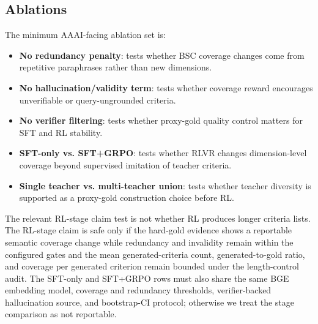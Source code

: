 
\subsection{Ablations}

The minimum AAAI-facing ablation set is:
\begin{itemize}
  \item \textbf{No redundancy penalty}: tests whether BSC coverage changes come from
  repetitive paraphrases rather than new dimensions.
  \item \textbf{No hallucination/validity term}: tests whether coverage reward
  encourages unverifiable or query-ungrounded criteria.
  \item \textbf{No verifier filtering}: tests whether proxy-gold quality
  control matters for SFT and RL stability.
  \item \textbf{SFT-only vs. SFT+GRPO}: tests whether RLVR changes
  dimension-level coverage beyond supervised imitation of teacher criteria.
  \item \textbf{Single teacher vs. multi-teacher union}: tests whether teacher
  diversity is supported as a proxy-gold construction choice before RL.
\end{itemize}
The relevant RL-stage claim test is not whether RL produces longer criteria
lists. The RL-stage claim is safe only if the hard-gold evidence shows a
reportable semantic coverage change while redundancy and invalidity remain within the configured gates and
the mean generated-criteria count, generated-to-gold ratio, and coverage per
generated criterion remain bounded under the length-control audit. The
SFT-only and SFT+GRPO rows must also share the same BGE embedding model,
coverage and redundancy thresholds, verifier-backed hallucination source, and
bootstrap-CI protocol; otherwise we treat the stage comparison as not
reportable.

